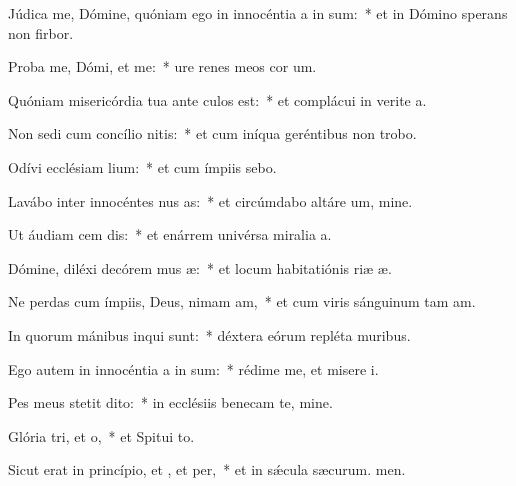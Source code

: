 \item Júdica me, Dómine, quóniam ego in innocéntia a in sum:~* et in Dómino sperans non firbor.
\item Proba me, Dómi, et  me:~* ure renes meos  cor um.
\item Quóniam misericórdia tua ante culos  est:~* et complácui in verite a.
\item Non sedi cum concílio nitis:~* et cum iníqua geréntibus non trobo.
\item Odívi ecclésiam lium:~* et cum ímpiis  sebo.
\item Lavábo inter innocéntes nus as:~* et circúmdabo altáre um, mine.
\item Ut áudiam cem dis:~* et enárrem univérsa miralia a.
\item Dómine, diléxi decórem mus æ:~* et locum habitatiónis riæ æ.
\item Ne perdas cum ímpiis, Deus, nimam am,~* et cum viris sánguinum tam am.
\item In quorum mánibus inqui sunt:~* déxtera eórum repléta  muribus.
\item Ego autem in innocéntia a in sum:~* rédime me, et misere i.
\item Pes meus stetit  dito:~* in ecclésiis benecam te, mine.
\item Glória tri, et o,~* et Spitui to.
\item Sicut erat in princípio, et , et per,~* et in sǽcula sæcurum. men.
